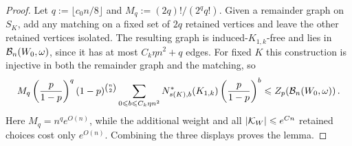 \begin{proof}
Let $q:=\lfloor c_0n/8\rfloor$ and $M_q:=(2q)!/(2^qq!)$. Given a remainder graph on $S_K$, add any matching on a fixed set of $2q$ retained vertices and leave the other retained vertices isolated. The resulting graph is induced-$K_{1,k}$-free and lies in ${\mathcal B}_n(W_0,\omega)$, since it has at most $C_k\eta n^2+q$ edges. For fixed $K$ this construction is injective in both the remainder graph and the matching, so
\begin{equation}\label{eqn:critical-matching-transfer-K1k}
M_q\left(\frac{p}{1-p}\right)^q(1-p)^{\binom n2}\sum_{0\leqslant b\leqslant C_k\eta n^2}N^\ast_{s(K),b}(K_{1,k})\left(\frac{p}{1-p}\right)^b\leqslant Z_p({\mathcal B}_n(W_0,\omega))\,.
\end{equation}
Here $M_q=n^qe^{O(n)}$, while the additional weight and all $|{\mathcal K}_W|\leqslant e^{Cn}$ retained choices cost only $e^{O(n)}$. Combining the three displays proves the lemma.
\end{proof}

